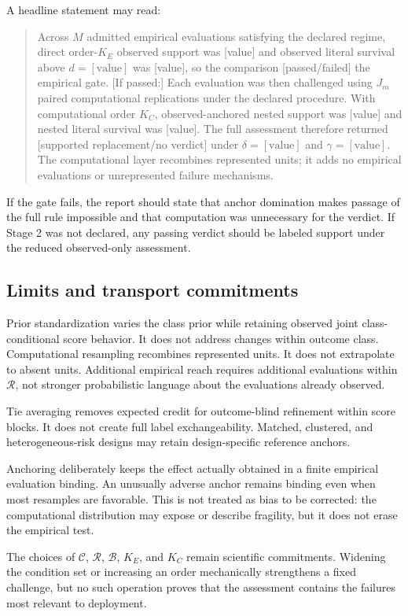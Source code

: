 \documentclass[11pt]{article}
\newcommand{\Regime}{\mathcal{R}}
\newcommand{\CSet}{\mathcal{C}}
\newcommand{\Boot}{\mathcal{B}}
\theoremstyle{remark}
\begin{document}
A headline statement may read:
\begin{quote}
Across $M$ admitted empirical evaluations satisfying the declared
regime, direct order-$K_E$ observed support was [value] and observed literal
survival above $d=[\text{value}]$ was [value], so the comparison
[passed/failed] the empirical gate. [If passed:] Each evaluation was then
challenged using $J_m$ paired computational replications under the declared
procedure. With computational order $K_C$, observed-anchored nested support was
[value] and nested literal survival was [value]. The full assessment therefore
returned [supported replacement/no verdict] under $\delta=[\text{value}]$ and
$\gamma=[\text{value}]$. The computational layer recombines represented units;
it adds no empirical evaluations or unrepresented failure mechanisms.
\end{quote}
If the gate fails, the report should state that anchor domination makes passage
of the full rule impossible and that computation was unnecessary for the
verdict. If Stage 2 was not declared, any passing verdict should be labeled
support under the reduced observed-only assessment.

\subsection{Limits and transport commitments}

Prior standardization varies the class prior while retaining observed joint
class-conditional score behavior. It does not address changes within outcome
class. Computational resampling recombines represented units. It does not
extrapolate to absent units. Additional empirical reach requires additional
evaluations within $\Regime$, not stronger probabilistic language about the
evaluations already observed.

Tie averaging removes expected credit for outcome-blind refinement within
score blocks. It does not create full label exchangeability. Matched,
clustered, and heterogeneous-risk designs may retain design-specific reference
anchors.

Anchoring deliberately keeps the effect actually obtained in a finite
empirical evaluation binding. An unusually adverse anchor remains binding even
when most resamples are favorable. This is not treated as bias to be corrected:
the computational distribution may expose or describe fragility, but it does
not erase the empirical test.

The choices of $\CSet$, $\Regime$, $\Boot$, $K_E$, and $K_C$ remain
scientific commitments. Widening the condition set or increasing an order
mechanically strengthens a fixed challenge, but no such operation proves that
the assessment contains the failures most relevant to deployment.
\end{document}
